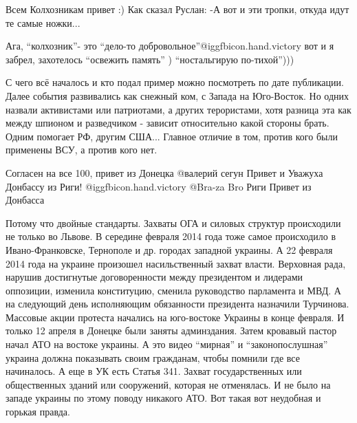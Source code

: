 \begin{multicols}{2} %
\setlength{\parindent}{0pt}\em
{}


Всем Колхозникам привет :)
Как сказал Руслан: 
-А вот и эти тропки, откуда идут те самые ножки... 


Ага, \enquote{колхозник}- это \enquote{дело-то добровольное}@igg{fbicon.hand.victory} вот и я забрел,
захотелось \enquote{освежить память} )  \enquote{ностальгирую по-тихой}))) 


С чего всё началось и кто подал пример можно посмотреть по дате публикации.
Далее события развивались как снежный ком, с Запада на Юго-Восток. Но одних
назвали активистами или патриотами, а других терористами, хотя разница эта как
между  шпионом и разведчиком - зависит относительно какой стороны брать. Одним
помогает РФ, другим США... Главное отличие в том, против кого были применены
ВСУ, а против кого нет. 

\begin{itemize} %
Согласен на все 100, привет из Донецка
 @валерий сегун  Привет и Уважуха Донбассу из Риги! @igg{fbicon.hand.victory}
 @Bra-za Bro  Риги Привет из Донбасса 


Потому что двойные стандарты. Захваты ОГА и силовых структур происходили не
только во Львове. В середине февраля 2014 года тоже самое  происходило в
Ивано-Франковске, Тернополе и др. городах западной украины. А 22 февраля 2014
года на украине произошел насильственный захват власти. Верховная рада, нарушив
достигнутые договоренности между президентом и лидерами оппозиции, изменила
конституцию, сменила руководство парламента и МВД. А на следующий день
исполняющим обязанности президента назначили Турчинова. Массовые акции протеста
начались на юго-востоке Украины в конце февраля. И только 12 апреля в Донецке
были заняты админздания. Затем кровавый пастор начал АТО на востоке украины. А
это видео \enquote{мирная} и \enquote{законопослушная} украина должна показывать своим
гражданам, чтобы помнили где все начиналось. А еще в УК есть Статья 341. Захват
государственных или общественных зданий или сооружений, которая не отменялась.
И не было на западе украины по этому поводу никакого АТО. Вот такая вот
неудобная и горькая правда. 


\end{itemize}
\end{multicols}
